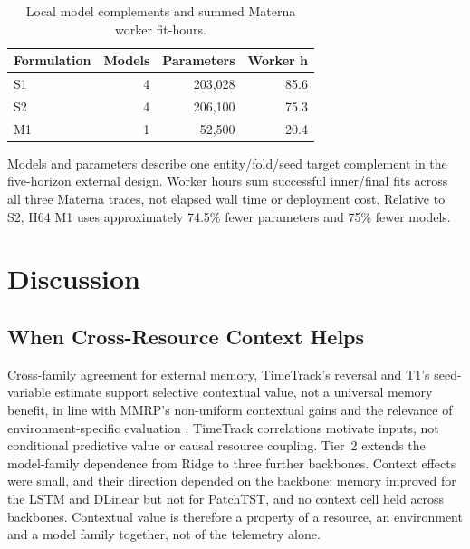 \documentclass[5p,twocolumn]{elsarticle}
\begin{document}
\begin{table}[t]
  \caption{Local model complements and summed Materna worker fit-hours.}
  \label{tab:efficiency}
  \centering
  \small
  \begin{tabular}{@{}lrrr@{}}
    \toprule
    Formulation & Models & Parameters & Worker h \\
    \midrule
    S1 & 4 & 203,028 & 85.6 \\
    S2 & 4 & 206,100 & 75.3 \\
    M1 & 1 &  52,500 & 20.4 \\
    \bottomrule
  \end{tabular}

  \vspace{2pt}
  \parbox{\columnwidth}{\footnotesize Models and parameters describe one
  entity/fold/seed target complement in the five-horizon external design.
  Worker hours sum successful inner/final fits across all three Materna
  traces, not elapsed wall time or deployment cost. Relative to S2, H64 M1
  uses approximately 74.5\% fewer parameters and 75\% fewer models.}
\end{table}

\section{Discussion}
\label{sec:discussion}

\subsection{When Cross-Resource Context Helps}
\label{sec:discussion-context}

Cross-family agreement for external memory, TimeTrack's reversal and T1's
seed-variable estimate support selective contextual value, not a universal
memory benefit, in line with MMRP's non-uniform contextual gains
\citep{Tripathi2025MMRP} and the relevance of environment-specific evaluation
\citep{Rossi2025CloudUncertainty}. TimeTrack correlations
\citep{Meliani2025TimeTrack} motivate inputs, not conditional predictive value
or causal resource coupling.
Tier~2 extends the model-family dependence from Ridge to three further
backbones. Context effects were small, and their direction depended on the
backbone: memory improved for the LSTM and DLinear but not for PatchTST, and
no context cell held across backbones. Contextual value is therefore a
property of a resource, an environment and a model family together, not of
the telemetry alone.
\end{document}
